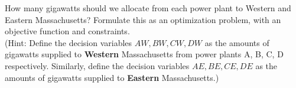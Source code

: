 \documentclass[12pt]{article}
\begin{document}
 How many gigawatts should we allocate from each power plant to Western and Eastern Massachusetts?  Formulate this as an optimization problem, with an objective function and constraints. \\
 
(Hint: Define the decision variables $AW, BW, CW, DW$ as the amounts of gigawatts supplied to {\bf Western} Massachusetts from power plants A, B, C, D respectively.  Similarly, define the decision variables $AE, BE, CE, DE$ as the amounts of gigawatts supplied to {\bf Eastern} Massachusetts.)
\end{document}
